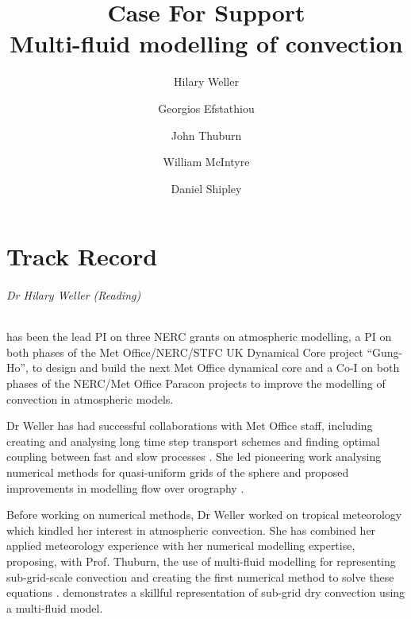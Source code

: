 \documentclass[11pt,a4paper]{article}
\begin{document}
\title{Case For Support \\ \Large
Multi-fluid modelling of convection
}
\author{Hilary Weller \and Georgios Efstathiou \and John Thuburn \and William McIntyre \and Daniel Shipley}
\date{}
\maketitle

\part{Track Record}

\paragraph*{Dr Hilary Weller (Reading)} has been the lead PI on three NERC grants on atmospheric modelling, a PI on both phases of the Met Office/NERC/STFC UK Dynamical Core project ``Gung-Ho'', to design and build the next Met Office dynamical core and a Co-I on both phases of the NERC/Met Office Paracon projects to improve the modelling of convection in atmospheric models.

Dr Weller has had successful collaborations with Met Office staff, including creating and analysing long time step transport schemes \cite[]{CWPS17,SWMD17} and finding optimal coupling between fast and slow processes \cite[][]{WLW13}. She led pioneering work analysing numerical methods for quasi-uniform grids of the sphere \cite[e.g.][]{WWF09,Wel12,WTC12} and proposed improvements in modelling flow over orography \cite[]{WS14}. 

Before working on numerical methods, Dr Weller worked on tropical meteorology \cite[e.g.][]{LGWS09} which kindled her interest in atmospheric convection. She has combined her applied meteorology experience with her numerical modelling expertise, proposing, with Prof. Thuburn, the use of multi-fluid modelling for representing sub-grid-scale convection \cite[]{TWV+18} and creating the first numerical method to solve these equations \cite[]{WM19}. \cite{WMS20} demonstrates a skillful representation of sub-grid dry convection using a multi-fluid model.
\end{document}
